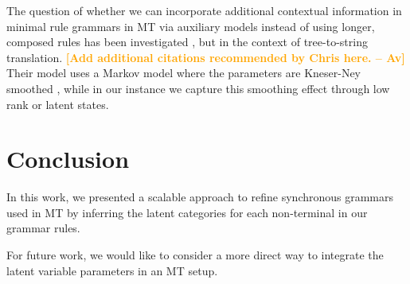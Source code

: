 \documentclass[11pt]{article}
\newcommand{\avcomment}[1]{\textcolor{orange}{\textbf{[#1 -- Av]}}}
\begin{document}
The question of whether we can incorporate additional contextual information in minimal rule grammars in MT via auxiliary models instead of using longer, composed rules has been investigated \cite{Vaswani2011}, but in the context of tree-to-string translation. 
\avcomment{Add additional citations recommended by Chris here.}
Their model uses a Markov model where the parameters are Kneser-Ney smoothed \cite{Kneser1993}, while in our instance we capture this smoothing effect through low rank or latent states.  

\section{Conclusion}

In this work, we presented a scalable approach to refine synchronous grammars used in MT by inferring the latent categories for each non-terminal in our grammar rules.

For future work, we would like to consider a more direct way to integrate the latent variable parameters in an MT setup.  



\end{document}
